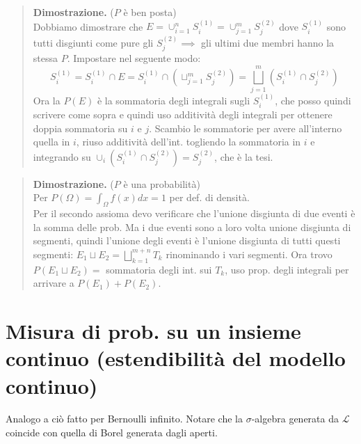 \documentclass[a4paper,10pt]{article}
\theoremstyle{remark}
\theoremstyle{definition}
\newenvironment{dimo}{\begin{quote}\textbf{Dimostrazione.}}{\end{quote}} %
\begin{document}
\begin{itemize}
\begin{dimo}
    ($P$ è ben posta) \\
    Dobbiamo dimostrare che $E= \cup_{i=1}^n S_i^{(1)}= \cup_{j=1}^m S_j^{(2)}$ dove $S_i^{(1)}$ sono tutti disgiunti come pure gli $S_j^{(2)} \implies$ gli ultimi due membri hanno la stessa $P$. Impostare nel seguente modo:
    $$S_i^{(1)}=S_i^{(1)}\cap E=S_i^{(1)}\cap (\sqcup_{j=1}^m S_j^{(2)})=\bigsqcup_{j=1}^m(S_i^{(1)}\cap S_j^{(2)})$$
    Ora la $P(E)$ è la sommatoria degli integrali sugli $S_i^{(1)}$, che posso quindi scrivere come sopra e quindi uso additività degli integrali per ottenere doppia sommatoria su $i$ e $j$. Scambio le sommatorie per avere all'interno quella in $i$, riuso additività dell'int. togliendo la sommatoria in $i$ e integrando su $\cup_i (S_i^{(1)}\cap S_j^{(2)}) = S_j^{(2)}$, che è la tesi. 
\end{dimo}

\begin{dimo}
    ($P$ è una probabilità) \\
    Per $P(\Omega)=\int_\Omega f(x)dx=1$ per def. di densità. \\
    Per il secondo assioma devo verificare che l'unione disgiunta di due eventi è la somma delle prob. Ma i due eventi sono a loro volta unione disgiunta di segmenti, quindi l'unione degli eventi è l'unione disgiunta di tutti questi segmenti: $E_1\sqcup E_2=\bigsqcup_{k=1}^{m+n}T_k$ rinominando i vari segmenti. Ora trovo $P(E_1\sqcup E_2)=$ sommatoria degli int. sui $T_k$, uso prop. degli integrali per arrivare a $P(E_1)+P(E_2)$.
\end{dimo}

\end{itemize}

\section{Misura di prob. su un insieme continuo (estendibilità del modello continuo)}
Analogo a ciò fatto per Bernoulli infinito. Notare che la $\sigma$-algebra generata da $\mathscr{L}$ coincide con quella di Borel generata dagli aperti.










\newpage
\end{document}
